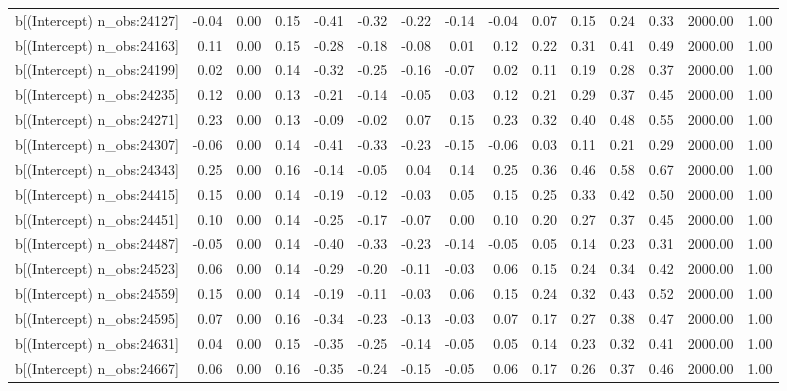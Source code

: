\begin{table}[ht]
\begin{tabular}{rrrrrrrrrrrrrrr}
  b[(Intercept) n\_obs:24127] & -0.04 & 0.00 & 0.15 & -0.41 & -0.32 & -0.22 & -0.14 & -0.04 & 0.07 & 0.15 & 0.24 & 0.33 & 2000.00 & 1.00 \\ 
  b[(Intercept) n\_obs:24163] & 0.11 & 0.00 & 0.15 & -0.28 & -0.18 & -0.08 & 0.01 & 0.12 & 0.22 & 0.31 & 0.41 & 0.49 & 2000.00 & 1.00 \\ 
  b[(Intercept) n\_obs:24199] & 0.02 & 0.00 & 0.14 & -0.32 & -0.25 & -0.16 & -0.07 & 0.02 & 0.11 & 0.19 & 0.28 & 0.37 & 2000.00 & 1.00 \\ 
  b[(Intercept) n\_obs:24235] & 0.12 & 0.00 & 0.13 & -0.21 & -0.14 & -0.05 & 0.03 & 0.12 & 0.21 & 0.29 & 0.37 & 0.45 & 2000.00 & 1.00 \\ 
  b[(Intercept) n\_obs:24271] & 0.23 & 0.00 & 0.13 & -0.09 & -0.02 & 0.07 & 0.15 & 0.23 & 0.32 & 0.40 & 0.48 & 0.55 & 2000.00 & 1.00 \\ 
  b[(Intercept) n\_obs:24307] & -0.06 & 0.00 & 0.14 & -0.41 & -0.33 & -0.23 & -0.15 & -0.06 & 0.03 & 0.11 & 0.21 & 0.29 & 2000.00 & 1.00 \\ 
  b[(Intercept) n\_obs:24343] & 0.25 & 0.00 & 0.16 & -0.14 & -0.05 & 0.04 & 0.14 & 0.25 & 0.36 & 0.46 & 0.58 & 0.67 & 2000.00 & 1.00 \\ 
  b[(Intercept) n\_obs:24415] & 0.15 & 0.00 & 0.14 & -0.19 & -0.12 & -0.03 & 0.05 & 0.15 & 0.25 & 0.33 & 0.42 & 0.50 & 2000.00 & 1.00 \\ 
  b[(Intercept) n\_obs:24451] & 0.10 & 0.00 & 0.14 & -0.25 & -0.17 & -0.07 & 0.00 & 0.10 & 0.20 & 0.27 & 0.37 & 0.45 & 2000.00 & 1.00 \\ 
  b[(Intercept) n\_obs:24487] & -0.05 & 0.00 & 0.14 & -0.40 & -0.33 & -0.23 & -0.14 & -0.05 & 0.05 & 0.14 & 0.23 & 0.31 & 2000.00 & 1.00 \\ 
  b[(Intercept) n\_obs:24523] & 0.06 & 0.00 & 0.14 & -0.29 & -0.20 & -0.11 & -0.03 & 0.06 & 0.15 & 0.24 & 0.34 & 0.42 & 2000.00 & 1.00 \\ 
  b[(Intercept) n\_obs:24559] & 0.15 & 0.00 & 0.14 & -0.19 & -0.11 & -0.03 & 0.06 & 0.15 & 0.24 & 0.32 & 0.43 & 0.52 & 2000.00 & 1.00 \\ 
  b[(Intercept) n\_obs:24595] & 0.07 & 0.00 & 0.16 & -0.34 & -0.23 & -0.13 & -0.03 & 0.07 & 0.17 & 0.27 & 0.38 & 0.47 & 2000.00 & 1.00 \\ 
  b[(Intercept) n\_obs:24631] & 0.04 & 0.00 & 0.15 & -0.35 & -0.25 & -0.14 & -0.05 & 0.05 & 0.14 & 0.23 & 0.32 & 0.41 & 2000.00 & 1.00 \\ 
  b[(Intercept) n\_obs:24667] & 0.06 & 0.00 & 0.16 & -0.35 & -0.24 & -0.15 & -0.05 & 0.06 & 0.17 & 0.26 & 0.37 & 0.46 & 2000.00 & 1.00 \\ 

\end{tabular}
\end{table}
